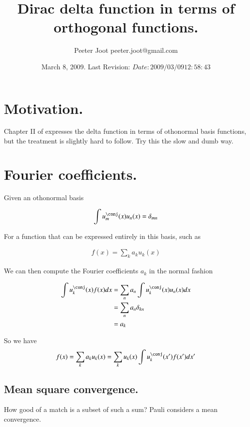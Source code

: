 \documentclass{article}
\title{ Dirac delta function in terms of orthogonal functions. }
\author{Peeter Joot \quad peeter.joot@gmail.com }
\date{ March 8, 2009.  Last Revision: $Date: 2009/03/09 12:58:43 $ }
\begin{document}
\maketitle{}

\section{ Motivation. }

Chapter II of \cite{pauli2000wm} expresses the delta function in terms of othonormal basis functions, but the treatment is slightly
hard to follow.  Try this the slow and dumb way.

\section{ Fourier coefficients. }

Given an othonormal basis 

\begin{align*}
\int u_m^\conj(x) u_n(x) = \delta_{mn}
\end{align*}

For a function that can be expressed entirely in this basis, such as

\begin{align*}
f(x) = \sum_k a_k u_k(x)
\end{align*}

We can then compute the Fourier coefficients $a_k$ in the normal fashion

\begin{align*}
\int u_k^\conj(x) f(x) dx 
&= \sum_n a_n \int u_k^\conj(x) u_n(x) dx \\
&= \sum_n a_n \delta_{kn} \\
&= a_k \\
\end{align*}

So we have 
\begin{align*}
f(x) = \sum_k a_k u_k(x)  = \sum_k u_k(x) \int u_k^\conj(x') f(x') dx'
\end{align*}

\subsection{ Mean square convergence. }

How good of a match is a subset of such a sum?  Pauli considers a mean convergence.
\end{document}
